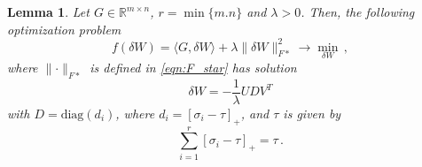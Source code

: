 \documentclass{article} %
\newtheorem{lemma}{Lemma}
\newcommand{\norm}[1]{\lVert #1\rVert}
\begin{document}
\begin{lemma}\label{lem:opt_F_star}
Let $G \in \mathbb{R}^{m \times n}$, $r = \min\{m. n\}$ and $\lambda > 0$. Then, the following optimization problem
\begin{equation*} 
  f(\delta W) = \langle G, \delta W \rangle + \lambda \norm{\delta W}_{F*}^2 \to \min_{\delta W}\,,
\end{equation*}
where $\norm{\cdot}_{F*}$ is defined in \eqref{eqn:F_star} has solution 
\begin{equation}
\delta W = -\frac{1}{\lambda}UDV^T
\end{equation} 
with $D = \text{diag}(d_i)$, where $d_i = [\sigma_i - \tau]_+$, and $\tau$ is given by
\begin{equation}
    \sum_{i=1}^r [\sigma_i - \tau]_+ = \tau\,.
\end{equation}
\end{lemma}
\end{document}
